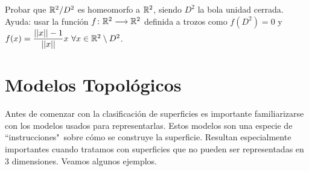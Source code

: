 \documentclass[GTS.tex]{subfiles}
\begin{document}
\begin{ejer} Probar que $\mathbb{R}^2/D^2$ es homeomorfo a $\mathbb{R}^2$, siendo $D^2$ la bola unidad cerrada. Ayuda: usar la función $f\colon{\mathbb{R}^2}\longrightarrow{\mathbb{R}^2}$ definida a trozos como $f(D^2)=0$ y $f(x)=\dfrac{||x||-1}{||x||}x\ \forall x\in\mathbb{R}^2\setminus D^2$.
\end{ejer}

\newpage

\section{Modelos Topológicos}
Antes de comenzar con la clasificación de superficies es importante familiarizarse con los modelos usados para representarlas. Estos modelos son una especie de ``instrucciones"\ sobre cómo se construye la superficie. Resultan especialmente importantes cuando tratamos con superficies que no pueden ser representadas en 3 dimensiones. Veamos algunos ejemplos.

\vspace{0.4cm}
\end{document}
